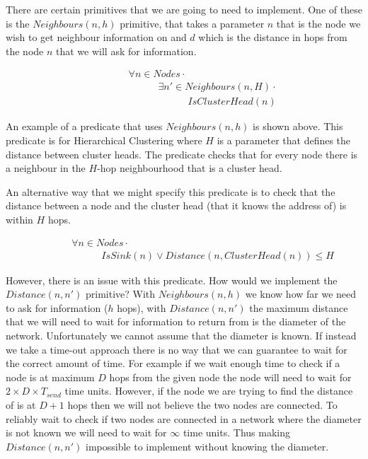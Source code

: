There are certain primitives that we are going to need to implement. One of these is the $Neighbours(n, h)$ primitive, that takes a parameter $n$ that is the node we wish to get neighbour information on and $d$ which is the distance in hops from the node $n$ that we will ask for information.

\begin{align}
\label{eq:hcluster-neighbours-predicate}
& \hspace{3em}	\forall n \in Nodes \cdot \\
& \hspace{6em}		\exists n' \in Neighbours(n, H) \cdot \\
& \hspace{9em}			IsClusterHead(n)
\end{align}

An example of a predicate that uses $Neighbours(n, h)$ is shown above. This predicate is for Hierarchical Clustering where $H$ is a parameter that defines the distance between cluster heads. The predicate checks that for every node there is a neighbour in the $H$-hop neighbourhood that is a cluster head.

An alternative way that we might specify this predicate is to check that the distance between a node and the cluster head (that it knows the address of) is within $H$ hops.

\begin{align}
\label{eq:hcluster-distance-predicate}
& \hspace{3em}	\forall n \in Nodes \cdot \\
& \hspace{6em}		IsSink(n) \lor Distance(n, ClusterHead(n)) \leq H
\end{align}

However, there is an issue with this predicate. How would we implement the $Distance(n, n')$ primitive? With $Neighbours(n, h)$ we know how far we need to ask for information ($h$ hops), with $Distance(n, n')$ the maximum distance that we will need to wait for information to return from is the diameter of the network. Unfortunately we cannot assume that the diameter is known. If instead we take a time-out approach there is no way that we can guarantee to wait for the correct amount of time. For example if we wait enough time to check if a node is at maximum $D$ hops from the given node the node will need to wait for $2 \times D \times T_{send}$ time units. However, if the node we are trying to find the distance of is at $D + 1 $ hops then we will not believe the two nodes are connected. To reliably wait to check if two nodes are connected in a network where the diameter is not known we will need to wait for $\infty$ time units. Thus making $Distance(n, n')$ impossible to implement without knowing the diameter.


